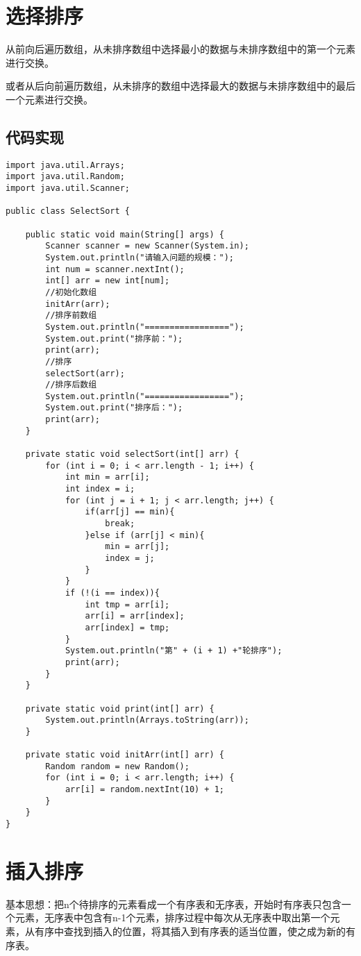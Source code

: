 \documentclass[a4paper]{report}
\begin{document}
\section{选择排序}
从前向后遍历数组，从未排序数组中选择最小的数据与未排序数组中的第一个元素进行交换。

或者从后向前遍历数组，从未排序的数组中选择最大的数据与未排序数组中的最后一个元素进行交换。
\subsection{代码实现}
\begin{lstlisting}
import java.util.Arrays;
import java.util.Random;
import java.util.Scanner;

public class SelectSort {

    public static void main(String[] args) {
        Scanner scanner = new Scanner(System.in);
        System.out.println("请输入问题的规模：");
        int num = scanner.nextInt();
        int[] arr = new int[num];
        //初始化数组
        initArr(arr);
        //排序前数组
        System.out.println("=================");
        System.out.print("排序前：");
        print(arr);
        //排序
        selectSort(arr);
        //排序后数组
        System.out.println("=================");
        System.out.print("排序后：");
        print(arr);
    }

    private static void selectSort(int[] arr) {
        for (int i = 0; i < arr.length - 1; i++) {
            int min = arr[i];
            int index = i;
            for (int j = i + 1; j < arr.length; j++) {
                if(arr[j] == min){
                    break;
                }else if (arr[j] < min){
                    min = arr[j];
                    index = j;
                }
            }
            if (!(i == index)){
                int tmp = arr[i];
                arr[i] = arr[index];
                arr[index] = tmp;
            }
            System.out.println("第" + (i + 1) +"轮排序");
            print(arr);
        }
    }

    private static void print(int[] arr) {
        System.out.println(Arrays.toString(arr));
    }

    private static void initArr(int[] arr) {
        Random random = new Random();
        for (int i = 0; i < arr.length; i++) {
            arr[i] = random.nextInt(10) + 1;
        }
    }
}
\end{lstlisting}
\section{插入排序}
基本思想：把n个待排序的元素看成一个有序表和无序表，开始时有序表只包含一个元素，无序表中包含有n-1个元素，排序过程中每次从无序表中取出第一个元素，从有序中查找到插入的位置，将其插入到有序表的适当位置，使之成为新的有序表。
\end{document}
